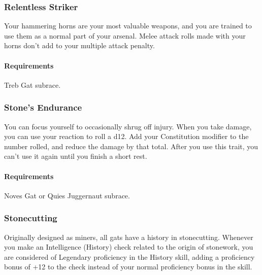     \subsubsection{Relentless Striker} \label{feat::relentlessstriker}
        Your hammering horns are your most valuable weapons, and you are trained to use them as a normal part of your arsenal.
        Melee attack rolls made with your horns don't add to your multiple attack penalty.
        \paragraph{Requirements} Treb Gat subrace.
    \subsubsection{Stone's Endurance} \label{feat::stonesendurance}
        You can focus yourself to occasionally shrug off injury.
        When you take damage, you can use your reaction to roll a d12.
        Add your Constitution modifier to the number rolled, and reduce the damage by that total.
        After you use this trait, you can't use it again until you finish a short rest.
        \paragraph{Requirements} Noves Gat or Quies Juggernaut subrace.
    \subsubsection{Stonecutting} \label{feat::stonecutting}
        Originally designed as miners, all gats have a history in stonecutting.
        Whenever you make an Intelligence (History) check related to the origin of stonework, you are considered of Legendary proficiency in the History skill, adding a proficiency bonus of +12 to the check instead of your normal proficiency bonus in the skill.

\newpage~\newpage
